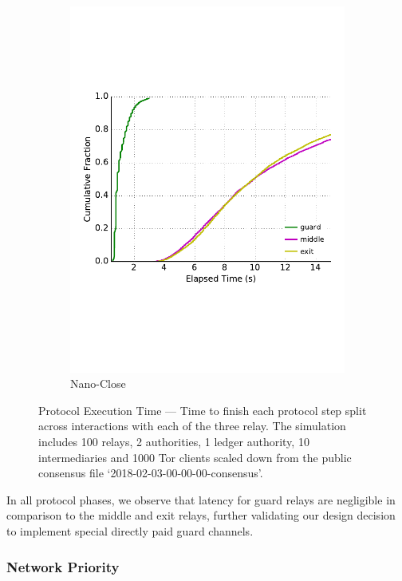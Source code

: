 \begin{figure}
\begin{subfigure}[t]{0.32\textwidth}
\includegraphics[trim={0 3cm 0 3cm}, clip, width=1.0\textwidth]{images/payment_close.pdf}
		\caption{Nano-Close}
\label{fig:payments_close}
	\end{subfigure}
	\caption{Protocol Execution Time --- Time to finish each protocol step
          split across interactions with each of the three relay. The simulation
          includes 100 relays, 2 authorities, 1 ledger authority, 10
          intermediaries and 1000 Tor clients scaled down from the public
          consensus file `2018-02-03-00-00-00-consensus'.}
\label{fig:latencymeasurements}
\end{figure}

In all protocol phases, we observe that latency for guard relays are negligible
in comparison to the middle and exit relays, further validating our design
decision to implement special directly paid guard channels.

\subsubsection{Network Priority}
\label{sec:priority_exp}

